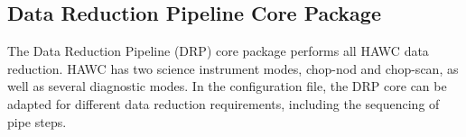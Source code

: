 \subsection{Data Reduction Pipeline Core Package}

The Data Reduction Pipeline (DRP) core package performs all HAWC data reduction. HAWC has two science instrument modes, chop-nod and chop-scan, as well as several diagnostic modes. In the configuration file, the DRP core can be adapted for different data reduction requirements, including the sequencing of pipe steps.

\begin{figure}[!ht]
\begin{minipage}{\textwidth}
\leavevmode \centering
{}
\hfil
\hfil
{}
\hfil
{}

\end{minipage}
\end{figure}

